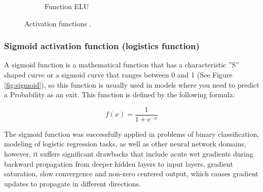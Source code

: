 \begin{figure}
{\begin{varwidth}{\textwidth}
\begin{subfigure}[h]{0.45\textwidth}
            \caption{Function ELU}
            \label{fig:elu}
        \end{subfigure}
        \end{varwidth}}
        \caption{Activation functions \protect\cite{Reference69}.}
        
		\label{fig:funciones_activacion}
    \end{figure}
    
\subsubsection{Sigmoid activation function (logistics function)}

A sigmoid function is a mathematical function that has a characteristic ''S'' shaped curve or a sigmoid curve that ranges between 0 and 1 (See Figure \ref{fig:sigmoid}), so this function is usually used in models where you need to predict a Probability as an exit. This function is defined by the following formula:

\begin{equation}
f(x) = \frac{1}{1+e^{-x}}
\end{equation}

The sigmoid function was successfully applied in problems of binary classification, modeling of logistic regression tasks, as well as other neural network domains, however, it suffers significant drawbacks that include acute wet gradients during backward propagation from deeper hidden layers to input layers, gradient saturation, slow convergence and non-zero centered output, which causes gradient updates to propagate in different directions.

